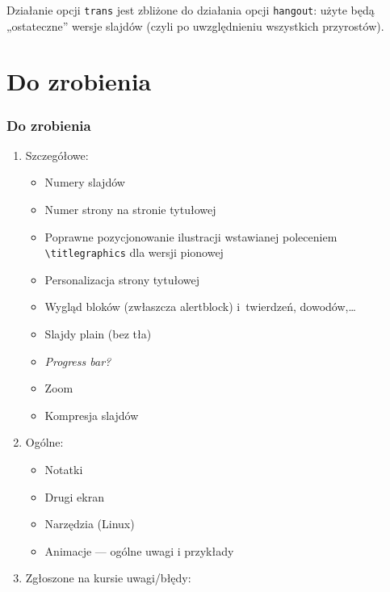 Działanie opcji \lstinline|trans| jest zbliżone do działania opcji \lstinline|hangout|: użyte będą „ostateczne” wersje slajdów (czyli po uwzględnieniu wszystkich przyrostów).



\section{Do zrobienia}

\begin{frame}
 \frametitle<presentation>{Do zrobienia}
 \begin{enumerate}
  \item
        Szczegółowe:
        \begin{itemize}
         \item[\done]
               Numery slajdów
         \item[\done]
               Numer strony na stronie tytułowej
         \item[\emptybox]
               Poprawne pozycjonowanie ilustracji wstawianej poleceniem \lstinline|\titlegraphics| dla wersji pionowej
         \item[\emptybox]
               Personalizacja strony tytułowej
         \item[\emptybox]
               Wygląd bloków (zwłaszcza alertblock) i~twierdzeń, dowodów,… %
         \item[\done]
               Slajdy plain (bez tła)
         \item[\emptybox]
               \emph{Progress bar?}
               \item [\emptybox] Zoom
               \item [\emptybox] Kompresja slajdów
        \end{itemize}
  \item Ogólne:
        \begin{itemize}
         \item[\emptybox]
               Notatki
         \item[\emptybox]
               Drugi ekran
         \item[\emptybox]
               Narzędzia (Linux)
               \item[\emptybox] 
               Animacje — ogólne uwagi i przykłady
        \end{itemize}
  \item Zgłoszone na kursie uwagi/błędy:

\end{enumerate}
\end{frame}
